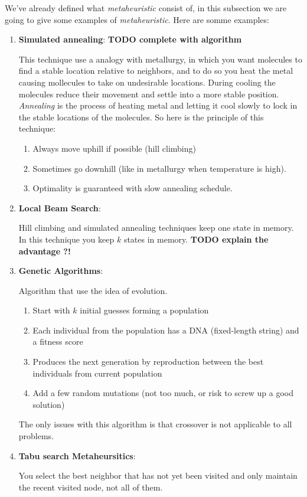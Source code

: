 We've already defined what \textit{metaheuristic} consist of, in this subsection we are going to give some examples of \textit{metaheuristic}. Here are somme examples:
\begin{enumerate}
\item \textbf{Simulated annealing}: \textbf{TODO complete with algorithm}

	This technique use a analogy with metallurgy, in which you want molecules to find a stable location relative to neighbors, and to do so you heat the metal causing mollecules to take on undesirable locations. During cooling the molecules reduce their movement and settle into a more stable position. \textit{Annealing} is the process of heating metal and letting it cool slowly to lock in the stable locations of the molecules. So here is the principle of this technique:
	\begin{enumerate}
		\item Always move uphill if possible (hill climbing)
		\item Sometimes go downhill (like in metallurgy when temperature is high).
		\item Optimality is guaranteed with slow annealing schedule. 
	\end{enumerate}

\item \textbf{Local Beam Search}:
	
	Hill climbing and simulated annealing techniques keep one state in memory. In this technique you keep $k$ states in memory. \textbf{TODO explain the advantage ?!}

\item \textbf{Genetic Algorithms}:

	Algorithm that use the idea of evolution.
	\begin{enumerate}
		\item Start with $k$ initial guesses forming a population
		\item Each individual from the population has a DNA (fixed-length string) and a fitness score
		\item Produces the next generation by reproduction between the best individuals from current population
		\item Add a few random mutations (not too much, or risk to screw up a good solution)
	\end{enumerate}
	The only issues with this algorithm is that crossover is not applicable to all problems.

\item \textbf{Tabu search Metaheursitics}:
	
	You select the best neighbor that has not yet been visited and only maintain the recent visited node, not all of them. 
\end{enumerate}

